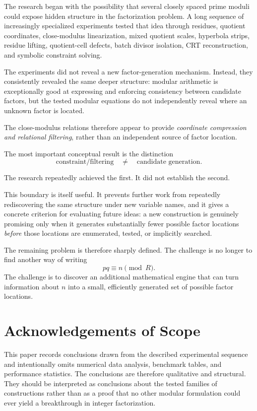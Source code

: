 \documentclass[11pt,a4paper]{article}
\begin{document}
The research began with the possibility that several closely spaced prime moduli could expose hidden structure in the factorization problem. A long sequence of increasingly specialized experiments tested that idea through residues, quotient coordinates, close-modulus linearization, mixed quotient scales, hyperbola strips, residue lifting, quotient-cell defects, batch divisor isolation, CRT reconstruction, and symbolic constraint solving.

The experiments did not reveal a new factor-generation mechanism. Instead, they consistently revealed the same deeper structure: modular arithmetic is exceptionally good at expressing and enforcing consistency between candidate factors, but the tested modular equations do not independently reveal where an unknown factor is located.

The close-modulus relations therefore appear to provide \emph{coordinate compression and relational filtering}, rather than an independent source of factor location.

The most important conceptual result is the distinction
\[
\boxed{\text{constraint/filtering}\quad\neq\quad\text{candidate generation}.}
\]

The research repeatedly achieved the first. It did not establish the second.

This boundary is itself useful. It prevents further work from repeatedly rediscovering the same structure under new variable names, and it gives a concrete criterion for evaluating future ideas: a new construction is genuinely promising only when it generates substantially fewer possible factor locations \emph{before} those locations are enumerated, tested, or implicitly searched.

The remaining problem is therefore sharply defined. The challenge is no longer to find another way of writing
\[
    pq\equiv n\pmod R.
\]
The challenge is to discover an additional mathematical engine that can turn information about $n$ into a small, efficiently generated set of possible factor locations.

\section*{Acknowledgements of Scope}

This paper records conclusions drawn from the described experimental sequence and intentionally omits numerical data analysis, benchmark tables, and performance statistics. The conclusions are therefore qualitative and structural. They should be interpreted as conclusions about the tested families of constructions rather than as a proof that no other modular formulation could ever yield a breakthrough in integer factorization.
\end{document}
